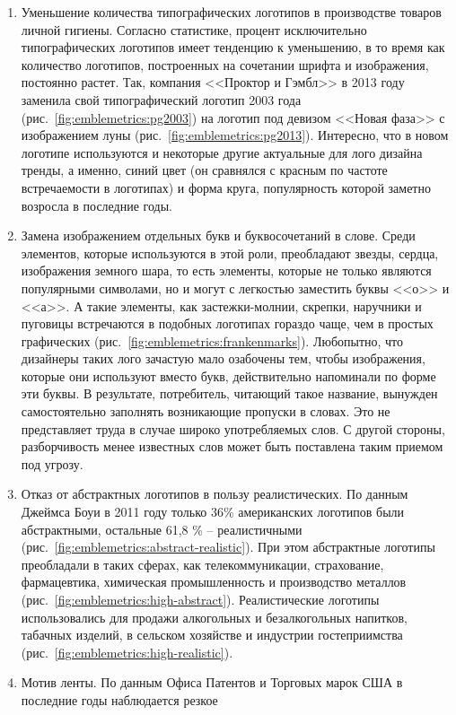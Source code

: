 \begin{enumerate}
\item Уменьшение количества  типографических логотипов в производстве товаров личной
  гигиены. Согласно статистике, процент исключительно типографических логотипов имеет тенденцию к
  уменьшению, в то время как количество логотипов,  построенных на сочетании шрифта и изображения,
  постоянно растет. Так, компания <<Проктор и Гэмбл>> в 2013 году заменила свой типографический
  логотип 2003 года (рис.~\ref{fig:emblemetrics:pg2003}) на  логотип  под девизом <<Новая фаза>>
  с изображением луны (рис.~\ref{fig:emblemetrics:pg2013}). Интересно, что в новом логотипе
  используются и некоторые другие актуальные для лого дизайна тренды,  а именно, синий цвет (он
  сравнялся с красным по частоте встречаемости в логотипах) и форма круга, популярность которой
  заметно возросла в последние годы.
\item Замена изображением отдельных букв и буквосочетаний в слове. Среди элементов, которые
  используются в этой роли, преобладают звезды, сердца, изображения земного шара, то есть элементы,
  которые не только являются популярными символами, но и могут с легкостью заместить буквы <<о>> и
  <<а>>. А такие элементы, как застежки-молнии, скрепки, наручники и пуговицы встречаются в подобных
  логотипах гораздо чаще, чем в простых графических (рис.~\ref{fig:emblemetrics:frankenmarks}).
  Любопытно, что дизайнеры таких лого зачастую мало озабочены тем, чтобы изображения, которые они
  используют вместо букв, действительно напоминали по форме эти буквы. В результате, потребитель,
  читающий такое название, вынужден самостоятельно заполнять возникающие пропуски в словах. Это не
  представляет труда в случае широко употребляемых слов. С другой стороны,  разборчивость менее
  известных слов может быть поставлена таким приемом под угрозу.
\item Отказ от абстрактных логотипов в пользу реалистических. По данным Джеймса Боуи в 2011 году
  только 36\% американских логотипов были абстрактными, остальные 61,8 \% -- реалистичными
  (рис.~\ref{fig:emblemetrics:abstract-realistic}). При этом абстрактные логотипы преобладали в
  таких сферах, как телекоммуникации, страхование, фармацевтика, химическая промышленность и
  производство металлов (рис.~\ref{fig:emblemetrics:high-abstract}). Реалистические логотипы
  использовались для продажи алкогольных и безалкогольных напитков, табачных изделий, в сельском
  хозяйстве и индустрии гостеприимства (рис.~\ref{fig:emblemetrics:high-realistic}).
\item Мотив ленты. По данным Офиса Патентов и Торговых марок США в последние годы наблюдается резкое

\end{enumerate}
